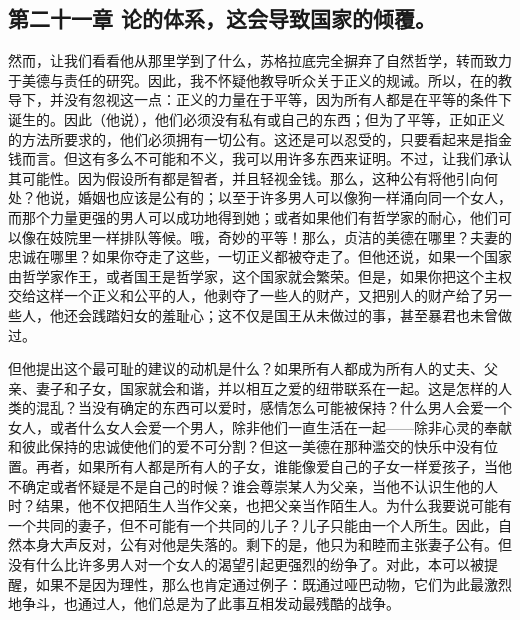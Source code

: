 
\subsection{第二十一章 论的体系，这会导致国家的倾覆。}

然而，让我们看看他从那里学到了什么，苏格拉底完全摒弃了自然哲学，转而致力于美德与责任的研究。因此，我不怀疑他教导听众关于正义的规诫。所以，在的教导下，并没有忽视这一点：正义的力量在于平等，因为所有人都是在平等的条件下诞生的。因此（他说），他们必须没有私有或自己的东西；但为了平等，正如正义的方法所要求的，他们必须拥有一切公有。这还是可以忍受的，只要看起来是指金钱而言。但这有多么不可能和不义，我可以用许多东西来证明。不过，让我们承认其可能性。因为假设所有都是智者，并且轻视金钱。那么，这种公有将他引向何处？他说，婚姻也应该是公有的；以至于许多男人可以像狗一样涌向同一个女人，而那个力量更强的男人可以成功地得到她；或者如果他们有哲学家的耐心，他们可以像在妓院里一样排队等候。哦，奇妙的平等！那么，贞洁的美德在哪里？夫妻的忠诚在哪里？如果你夺走了这些，一切正义都被夺走了。但他还说，如果一个国家由哲学家作王，或者国王是哲学家，这个国家就会繁荣。但是，如果你把这个主权交给这样一个正义和公平的人，他剥夺了一些人的财产，又把别人的财产给了另一些人，他还会践踏妇女的羞耻心；这不仅是国王从未做过的事，甚至暴君也未曾做过。\par

但他提出这个最可耻的建议的动机是什么？如果所有人都成为所有人的丈夫、父亲、妻子和子女，国家就会和谐，并以相互之爱的纽带联系在一起。这是怎样的人类的混乱？当没有确定的东西可以爱时，感情怎么可能被保持？什么男人会爱一个女人，或者什么女人会爱一个男人，除非他们一直生活在一起——除非心灵的奉献和彼此保持的忠诚使他们的爱不可分割？但这一美德在那种滥交的快乐中没有位置。再者，如果所有人都是所有人的子女，谁能像爱自己的子女一样爱孩子，当他不确定或者怀疑是不是自己的时候？谁会尊崇某人为父亲，当他不认识生他的人时？结果，他不仅把陌生人当作父亲，也把父亲当作陌生人。为什么我要说可能有一个共同的妻子，但不可能有一个共同的儿子？儿子只能由一个人所生。因此，自然本身大声反对，公有对他是失落的。剩下的是，他只为和睦而主张妻子公有。但没有什么比许多男人对一个女人的渴望引起更强烈的纷争了。对此，本可以被提醒，如果不是因为理性，那么也肯定通过例子：既通过哑巴动物，它们为此最激烈地争斗，也通过人，他们总是为了此事互相发动最残酷的战争。\par


